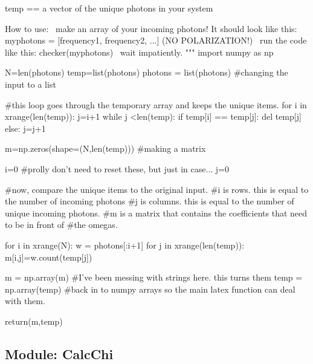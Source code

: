 \documentclass[11pt,a4paper,notitlepage]{article}
\begin{document}
\begin{code}
        temp == a vector of the unique photons in your system
        
    How to use:
        ~make an array of your incoming photons! It should look like this:
        myphotons = [frequency1, frequency2, ...] (NO POLARIZATION!)
        ~run the code like this:
        checker(myphotons)
        ~wait impatiently.
    """
    import numpy as np
    
    N=len(photons)
    temp=list(photons)
    photons = list(photons) #changing the input to a list
    
    
    #this loop goes through the temporary array and keeps the unique items.
    for i in xrange(len(temp)):
        j=i+1
        while j <len(temp):
            if temp[i] == temp[j]:
                del temp[j]
            else:
                j=j+1
                
    m=np.zeros(shape=(N,len(temp))) #making a matrix
    
    i=0 #prolly don't need to reset these, but just in case...
    j=0
    
    
    #now, compare the unique items to the original input.
    #i is rows. this is equal to the number of incoming photons
    #j is columns. this is equal to the number of unique incoming photons.
    #m is a matrix that contains the coefficients that need to be in front of
    #the omegas.

    for i in xrange(N):
        w = photons[:i+1]
        for j in xrange(len(temp)):
            m[i,j]=w.count(temp[j])
            
    m = np.array(m) #I've been messing with strings here. this turns them
    temp = np.array(temp) #back in to numpy arrays so the main latex function can deal with them.
                
    return(m,temp)
\end{code}

\subsection{Module: CalcChi}
\end{document}
